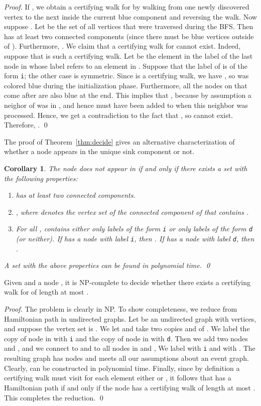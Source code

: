 \documentclass[oribibl,envcountsect,envcountsame]{llncs}
\newtheorem{corol}[theorem]{Corollary}
\begin{document}
\begin{proof}
If , 
we obtain a certifying walk for  
by walking from one newly discovered vertex to the next inside the current
blue component and reversing the walk. Now suppose . 
Let  be the set of all vertices that were traversed during the BFS. Then
 has  at least two connected
components (since there must be blue vertices outside of ). Furthermore, 
.
We claim that a certifying walk for  cannot exist. Indeed, suppose
that  is such a certifying walk. Let  be the element
in the label of the last node  in  whose label refers 
to an element in . Suppose that the label of  is of the form
\texttt{i}; the other case is symmetric. Since  is a
certifying walk, we have , so  was colored blue during the
initialization phase. Furthermore,
all the nodes on  that come after  are also blue at the end. 
This implies that 
, because by assumption a neighor of  was in , and hence
 must have been added to  when this neighbor was processed. 
Hence, we get a contradiction to the fact that 
, so
 cannot exist. Therefore, .
\qed\end{proof}

The proof of Theorem~\ref{thm:decide} gives an alternative characterization of
whether a node appears in the unique sink component or not.
\begin{corol}
The node  does not appear in  if and only if 
there exists a set  with the following properties: 
\begin{enumerate}
\item  has at least two connected components.
\item , where  denotes the
vertex set of the connected component
of  that contains .
\item For all ,  contains either only labels of the form 
\texttt{i} or only labels of the form \texttt{d} (or neither). 
If  has a node with label \texttt{i}, then .
If  has a node with label \texttt{d}, 
then .
\end{enumerate}
A set  with the above properties can be found in polynomial time.
\qed
\end{corol}

\begin{lemma}
Given   and a node , it is \textup{NP}-complete to 
decide whether there exists a certifying walk for  of length at most .
\end{lemma}

\begin{proof}
The problem is clearly in NP.
To show completeness, we reduce from  Hamiltonian path
in undirected graphs. Let  be an undirected graph with  vertices,
and suppose the vertex set is . We let  and take
two copies  and  of . We label the copy of node  in 
 with \texttt{i} and the copy of node  in  with 
\texttt{d}. Then we add two nodes  and , and we connect
  to  and 
to all nodes in  and , We label  with \texttt{i}
and  with . The resulting graph  has 
nodes and meets all our assumptions about an event graph.
Clearly,  can be constructed in polynomial time.
Finally, since by definition a certifying walk must visit for
each element  either  or , it follows that
 has a Hamiltonian path if and only if the
node  has a certifying walk of length
at most . This completes the reduction.
\qed\end{proof}
\end{document}
